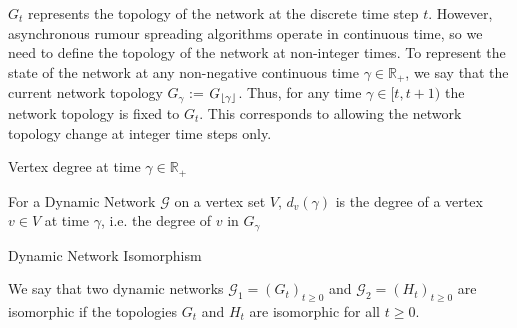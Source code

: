 $G_t$ represents the topology of the network at the discrete time step $t$. However, asynchronous rumour spreading algorithms operate in continuous time, so we need to define the topology of the network at non-integer times. To represent the state of the network at any non-negative continuous time $\gamma \in \mathbb{R}_+$, we say that the current network topology $G_\gamma$ := $G_{\lfloor\gamma\rfloor}$. Thus, for any time $\gamma \in [t, t + 1)$ the network topology is fixed to $G_t$. This corresponds to allowing the network topology change at integer time steps only.


\begin{definition}
	Vertex degree at time $\gamma \in \mathbb{R}_+ $ 

	\noindent
	For a Dynamic Network $\mathcal{G}$ on a vertex set $V$, $d_v(\gamma)$ is the degree of a vertex $v \in V$ at time $\gamma$, i.e. the degree of $v$ in $G_\gamma$
\end{definition}

\begin{definition}
	Dynamic Network Isomorphism

	We say that two dynamic networks $\mathcal{G}_1 = (G_t)_{t \geq 0}$ and $\mathcal{G}_2 = (H_t)_{t \geq 0}$ are isomorphic if the topologies $G_t$ and $H_t$ are isomorphic for all $t \geq 0$. 
\end{definition}



